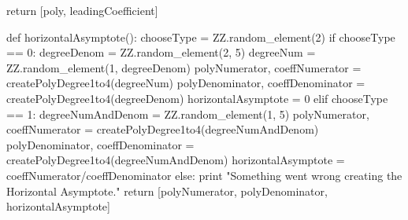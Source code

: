 \documentclass{ximera}
\begin{document}
\begin{sagesilent}
    return [poly, leadingCoefficient]
 
def horizontalAsymptote():
    chooseType = ZZ.random_element(2)
    if chooseType == 0:
        degreeDenom = ZZ.random_element(2, 5)
        degreeNum = ZZ.random_element(1, degreeDenom)
        polyNumerator, coeffNumerator = createPolyDegree1to4(degreeNum)
        polyDenominator, coeffDenominator = createPolyDegree1to4(degreeDenom)
        horizontalAsymptote = 0
    elif chooseType == 1:
        degreeNumAndDenom = ZZ.random_element(1, 5)
        polyNumerator, coeffNumerator = createPolyDegree1to4(degreeNumAndDenom)
        polyDenominator, coeffDenominator = createPolyDegree1to4(degreeNumAndDenom)
        horizontalAsymptote = coeffNumerator/coeffDenominator
    else:
        print "Something went wrong creating the Horizontal Asymptote."
    return [polyNumerator, polyDenominator, horizontalAsymptote]
     

\end{sagesilent}
\end{document}
